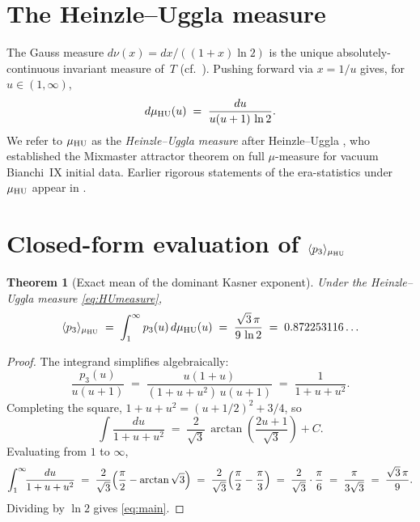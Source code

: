 \documentclass[11pt,a4paper]{article}
\newtheorem{theorem}{Theorem}
\begin{document}
\section{The Heinzle--Uggla measure}

The Gauss measure $d\nu(x)=dx/((1+x)\ln 2)$ is the unique
absolutely-continuous invariant measure of~$T$ (cf.\ \cite{Gauss1812,
Khinchin1964,Iosifescu2002}).  Pushing forward via $x=1/u$
gives, for $u\in(1,\infty)$,
\begin{equation}
  d\mu_{\rm HU}(u)\;=\;\frac{du}{u(u+1)\,\ln 2}.
\label{eq:HUmeasure}
\end{equation}
We refer to $\mu_{\rm HU}$ as the \emph{Heinzle--Uggla measure} after
Heinzle--Uggla \cite{HeinzleUggla2009}, who established the Mixmaster
attractor theorem on full $\mu$-measure for vacuum Bianchi~IX initial data.
Earlier rigorous statements of the era-statistics under~$\mu_{\rm HU}$
appear in \cite{KLKSS1985}.

\section{Closed-form evaluation of $\langle p_3\rangle_{\mu_{\rm HU}}$}
\label{sec:main}

\begin{theorem}[Exact mean of the dominant Kasner exponent]
\label{thm:main}
Under the Heinzle--Uggla measure \eqref{eq:HUmeasure},
\begin{equation}
  \langle p_3\rangle_{\mu_{\rm HU}}
  \;=\;\int_1^\infty p_3(u)\,d\mu_{\rm HU}(u)
  \;=\;\frac{\sqrt{3}\,\pi}{9\,\ln 2}
  \;=\;0.872253116\ldots
\label{eq:main}
\end{equation}
\end{theorem}

\begin{proof}
The integrand simplifies algebraically:
\[
  \frac{p_3(u)}{u(u+1)}
  \;=\;\frac{u(1+u)}{(1+u+u^2)\,u(u+1)}
  \;=\;\frac{1}{1+u+u^2}.
\]
Completing the square, $1+u+u^2=(u+1/2)^2+3/4$, so
\[
  \int\frac{du}{1+u+u^2}
  \;=\;\frac{2}{\sqrt{3}}\,\arctan\!\left(\frac{2u+1}{\sqrt{3}}\right)+C.
\]
Evaluating from $1$ to $\infty$,
\[
  \int_1^\infty\!\!\frac{du}{1+u+u^2}
  \;=\;\frac{2}{\sqrt{3}}\Bigl(\frac{\pi}{2}-\arctan\sqrt{3}\Bigr)
  \;=\;\frac{2}{\sqrt{3}}\Bigl(\frac{\pi}{2}-\frac{\pi}{3}\Bigr)
  \;=\;\frac{2}{\sqrt{3}}\cdot\frac{\pi}{6}
  \;=\;\frac{\pi}{3\sqrt{3}}
  \;=\;\frac{\sqrt{3}\,\pi}{9}.
\]
Dividing by $\ln 2$ gives \eqref{eq:main}.
\end{proof}
\end{document}
